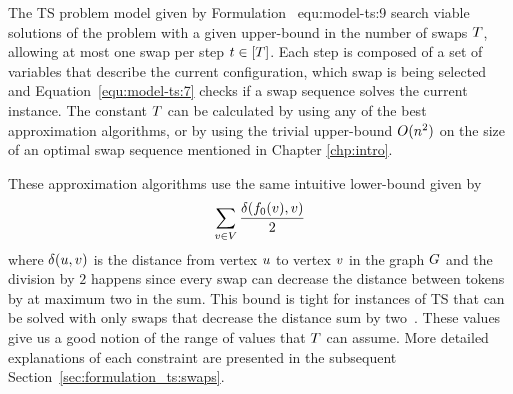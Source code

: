 \documentclass[msc]{ppgccufmg}    %
\begin{document}

The TS problem model given by Formulation~
{equ:model-ts:9} search viable solutions of the problem with a given 
upper-bound in the number of swaps $T$, allowing at most one swap 
per step $t \in [T]$.
Each step is composed of a set of variables that describe the current 
configuration, which swap is being selected and Equation~\ref{equ:model-ts:7}
checks if a swap sequence solves the current instance.
The constant $T$ can be calculated by using any of the best 
approximation algorithms, or by using the trivial upper-bound $O(
n^{2})$ on the size of an optimal swap sequence mentioned in Chapter
\ref{chp:intro}.


These approximation algorithms use the same intuitive lower-bound given by
$$\sum_{v \in V} \frac{\delta(f_{0}(v), v)}
{2}$$ where $\delta(u, v)$ is the distance from vertex 
$u$ to vertex $v$ in the graph $G$ and the division by $2$ 
happens since every swap can decrease the distance between tokens by at maximum 
two in the sum.
This bound is tight for instances of TS that can be solved with only swaps
that decrease the distance sum by two~\citep{Bonnet:2018}.
These values give us a good notion of the range of values that $T$ can
assume.
More detailed explanations of each constraint are presented in the subsequent  
Section~\ref{sec:formulation_ts:swaps}.


\end{document}

